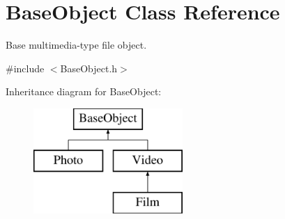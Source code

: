\hypertarget{classBaseObject}{\section{Base\+Object Class Reference}
\label{classBaseObject}
}


Base multimedia-\/type file object.  




{\ttfamily \#include $<$Base\+Object.\+h$>$}

Inheritance diagram for Base\+Object\+:\begin{figure}[H]
\begin{center}
\leavevmode
\includegraphics[height=4.000000cm]{classBaseObject}
\end{center}
\end{figure}
